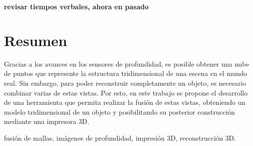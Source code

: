 \documentclass{pfc}
\subtitle{Informe final}
\newcommand{\TODO}[1]{{\color{red}\bfseries#1}}
\begin{document}
\frontmatter
\TODO{revisar tiempos verbales, ahora en pasado}
	\maketitle
	\chapter{Resumen}
		Gracias a los avances en los sensores de profundidad,
		es posible obtener una nube de puntos que represente la estructura tridimensional de una escena en el mundo real.
		Sin embargo, para poder reconstruir completamente un objeto, es necesario combinar varias de estas vistas.
		Por esto, en este trabajo se propone el desarrollo de una herramienta
		que permita realizar la fusión de estas vistas,
		obteniendo un modelo tridimensional de un objeto
		y posibilitando su posterior construcción mediante una impresora 3D.

		 fusión de mallas, imágenes de profundidad, impresión 3D, reconstrucción 3D.
	\tableofcontents
\mainmatter
	
	
	
	
	

	
	
\end{document}
